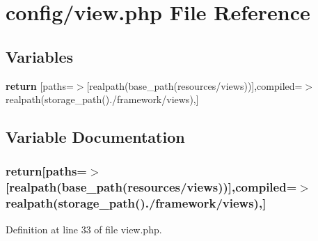 \section{config/view.php File Reference}
\label{config_2view_8php}
\subsection*{Variables}
\begin{DoxyCompactItemize}
\item 
{\bf return} [\textquotesingle{}paths\textquotesingle{}=$>$[realpath(base\+\_\+path(\textquotesingle{}resources/views\textquotesingle{}))],\textquotesingle{}compiled\textquotesingle{}=$>$ realpath(storage\+\_\+path().\textquotesingle{}/framework/views\textquotesingle{}),]
\end{DoxyCompactItemize}


\subsection{Variable Documentation}
\subsubsection[{return}]{\setlength{\rightskip}{0pt plus 5cm}return[\textquotesingle{}paths\textquotesingle{}=$>$[realpath(base\+\_\+path(\textquotesingle{}resources/views\textquotesingle{}))],\textquotesingle{}compiled\textquotesingle{}=$>$ realpath(storage\+\_\+path().\textquotesingle{}/framework/views\textquotesingle{}),]}\label{config_2view_8php_ac378045517ae42023071816f740dd3b4}


Definition at line 33 of file view.\+php.

